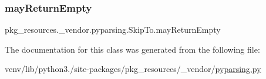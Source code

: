 \mbox{\label{classpkg__resources_1_1__vendor_1_1pyparsing_1_1SkipTo_ae89db83bfd10c2c9e91772eeda635f19}} 
\subsubsection{\texorpdfstring{may\+Return\+Empty}{mayReturnEmpty}}
{\footnotesize\ttfamily pkg\+\_\+resources.\+\_\+vendor.\+pyparsing.\+Skip\+To.\+may\+Return\+Empty}



The documentation for this class was generated from the following file\+:\begin{DoxyCompactItemize}
\item 
venv/lib/python3./site-\/packages/pkg\+\_\+resources/\+\_\+vendor/\hyperlink{pkg__resources_2__vendor_2pyparsing_8py}{pyparsing.\+py}\end{DoxyCompactItemize}
